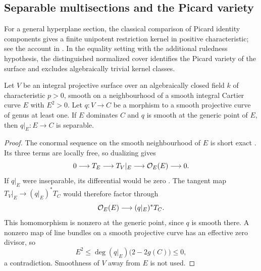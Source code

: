 \subsection{Separable multisections and the Picard variety}
\label{subsec:positive-genus-separable-picard}

For a general hyperplane section, the classical comparison of Picard
identity components gives a finite unipotent restriction kernel in positive
characteristic; see the account in
\cite[Remark~5.8, pp.~39--41]{KleimanPicard}.
In the equality setting with the additional ruledness hypothesis,
the distinguished normalized cover identifies
the Picard variety of the surface and excludes algebraically trivial
kernel classes.

\begin{lemma}\label{lem:positive-selfintersection-separable}
Let $V$ be an integral projective surface over an algebraically
closed field $k$ of characteristic $p>0$, smooth on a neighbourhood
of a smooth integral Cartier curve $E$ with $E^2>0$.
Let $q:V\to C$ be a morphism to a smooth projective curve of genus
at least one. If $E$ dominates $C$ and $q$ is smooth at the generic
point of $E$, then $q|_E:E\to C$ is separable.
\end{lemma}

\begin{proof}
The conormal sequence on the smooth neighbourhood of $E$ is
short exact \cite[Tag~06AA]{Stacks}. Its three terms are locally
free, so dualizing gives
\[
 0\longrightarrow T_E\longrightarrow T_V|_E
 \longrightarrow\mathcal O_E(E)\longrightarrow0.
\]
If $q|_E$ were inseparable, its differential would be zero
\cite[Tag~0C1C]{Stacks}. The tangent map
$T_V|_E\to(q|_E)^*T_C$ would therefore factor through
\[
 \mathcal O_E(E)\longrightarrow(q|_E)^*T_C.
\]
This homomorphism is nonzero at the generic point, since $q$ is
smooth there. A nonzero map of line bundles on a smooth projective
curve has an effective zero divisor, so
\[
 E^2\leq\deg(q|_E)\bigl(2-2g(C)\bigr)\leq0,
\]
a contradiction. Smoothness of $V$ away from $E$ is not used.
\end{proof}

